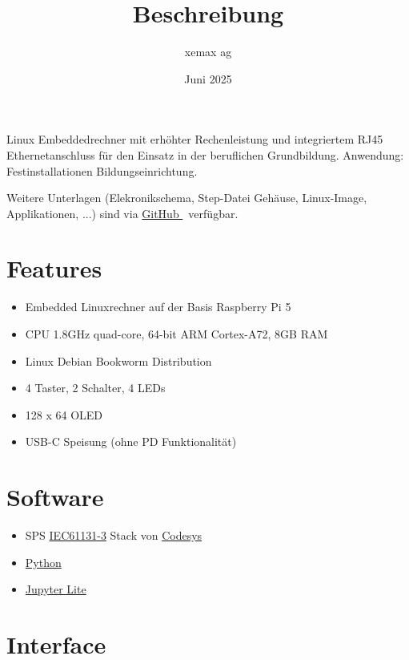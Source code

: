 \documentclass[10pt]{datasheet}
\title{Beschreibung \xlhPlattformID}
\author{xemax ag}
\date{Juni 2025}
\begin{document}
\maketitle



Linux Embeddedrechner mit erhöhter Rechenleistung und integriertem RJ45 Ethernetanschluss für den Einsatz in der beruflichen Grundbildung.
Anwendung: Festinstallationen Bildungseinrichtung.

Weitere Unterlagen (Elekronikschema, Step-Datei Gehäuse, Linux-Image, Applikationen, ...) sind via
\href{https://github.com/xemax-ag/xLH/}{GitHub \xlhPlattformID}\ verfügbar.

\section{Features}

\begin{itemize}
    \item Embedded Linuxrechner auf der Basis Raspberry Pi 5
    \item CPU 1.8GHz quad-core, 64-bit ARM Cortex-A72, 8GB RAM
    \item Linux Debian Bookworm Distribution
    \item 4 Taster, 2 Schalter, 4 LEDs
    \item 128 x 64 OLED
    \item USB-C Speisung (ohne PD Funktionalität)
\end{itemize}

\section{Software}

\begin{itemize}
    \item SPS \href{https://de.wikipedia.org/wiki/EN_61131}{IEC61131-3} Stack von \href{https://www.codesys.com/}{Codesys}
    \item \href{https://www.python.org/}{Python}
    \item \href{https://jupyter.org/try-jupyter/lab/}{Jupyter Lite}
\end{itemize}

\section{Interface}
\end{document}
